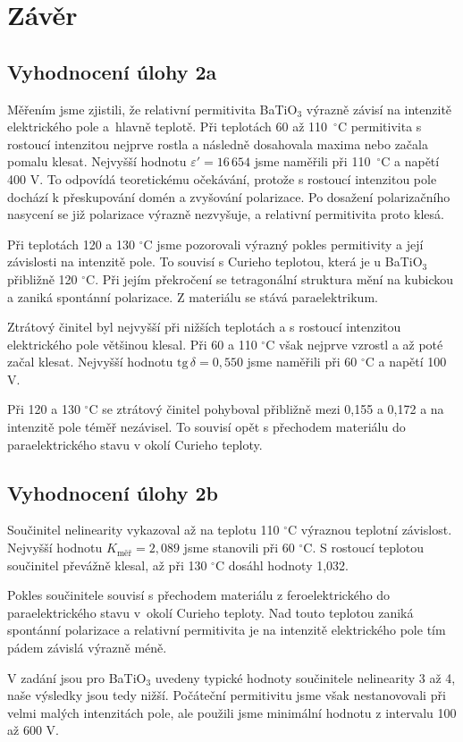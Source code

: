 \documentclass[11pt,a4paper]{article}
\begin{document}
\section{Závěr}

\subsection{Vyhodnocení úlohy 2a}

Měřením jsme zjistili, že relativní permitivita
BaTiO$_3$ výrazně závisí na intenzitě elektrického
pole a~hlavně teplotě. Při teplotách 60 až 110~$^\circ$C
permitivita s rostoucí intenzitou nejprve rostla
a následně dosahovala maxima nebo začala pomalu klesat.
Nejvyšší hodnotu $\varepsilon'=16\,654$ jsme
naměřili při 110~$^\circ$C a napětí 400 V.
To odpovídá teoretickému očekávání, protože
s rostoucí intenzitou pole dochází k přeskupování
domén a zvyšování polarizace. Po dosažení
polarizačního nasycení se již polarizace výrazně
nezvyšuje, a relativní permitivita proto klesá.

Při teplotách 120 a 130 $^\circ$C jsme pozorovali
výrazný pokles permitivity a její závislosti na
intenzitě pole. To souvisí s Curieho teplotou,
která je u BaTiO$_3$ přibližně 120 $^\circ$C.
Při jejím překročení se tetragonální struktura
mění na kubickou a zaniká spontánní polarizace.
Z materiálu se stává paraelektrikum.

Ztrátový činitel byl nejvyšší při nižších teplotách
a s rostoucí intenzitou elektrického pole většinou
klesal. Při 60 a 110 $^\circ$C však nejprve vzrostl
a až poté začal klesat. Nejvyšší hodnotu
$\mathrm{tg}\,\delta=0{,}550$ jsme naměřili
při 60 $^\circ$C a napětí 100 V.

Při 120 a 130 $^\circ$C se ztrátový činitel
pohyboval přibližně mezi 0,155 a 0,172
a na intenzitě pole téměř nezávisel.
To souvisí opět s přechodem materiálu do
paraelektrického stavu v okolí Curieho
teploty.

\subsection{Vyhodnocení úlohy 2b}

Součinitel nelinearity vykazoval až na teplotu 110 $^\circ$C
výraznou teplotní závislost. Nejvyšší hodnotu
$K_\mathrm{měř}=2{,}089$ jsme stanovili
při 60 $^\circ$C. S rostoucí teplotou
součinitel převážně klesal, až při
130 $^\circ$C dosáhl hodnoty 1,032.

Pokles součinitele souvisí s přechodem
materiálu z feroelektrického do
paraelektrického stavu v~okolí Curieho
teploty. Nad touto teplotou zaniká
spontánní polarizace a relativní
permitivita je na intenzitě elektrického
pole tím pádem závislá výrazně méně.

V zadání jsou pro BaTiO$_3$ uvedeny
typické hodnoty součinitele nelinearity
3 až 4, naše výsledky jsou tedy nižší.
Počáteční permitivitu jsme však
nestanovovali při velmi malých intenzitách
pole, ale použili jsme minimální hodnotu
z intervalu 100 až 600 V.
\end{document}
